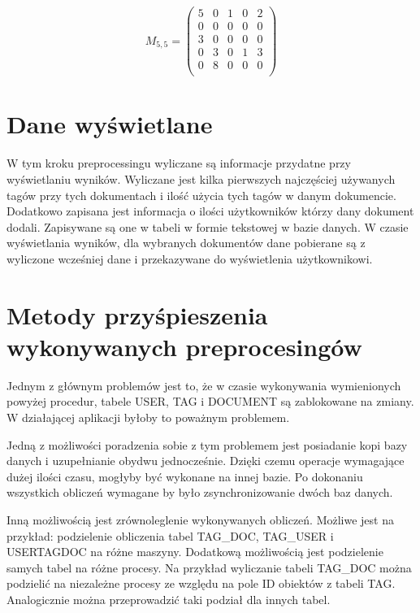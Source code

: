 \documentclass[11pt,a4paper]{report}
\begin{document}
\[
 M_{5,5} =
 \begin{pmatrix}
5 & 0 & 1 & 0 & 2\\
0 & 0 & 0 & 0 & 0\\
3 & 0 & 0 & 0 & 0\\
0 & 3 & 0 & 1 & 3\\
0 & 8 & 0 & 0 & 0\\

 \end{pmatrix}
\]


\section{Dane wyświetlane}
W tym kroku preprocessingu wyliczane są informacje przydatne przy wyświetlaniu wyników. Wyliczane jest kilka pierwszych najczęściej używanych tagów przy tych dokumentach i ilość użycia tych tagów w danym dokumencie. Dodatkowo zapisana jest informacja o ilości użytkowników którzy dany dokument dodali. Zapisywane są one w tabeli w formie tekstowej w bazie danych. W czasie wyświetlania wyników, dla wybranych dokumentów dane pobierane są z wyliczone wcześniej dane i przekazywane do wyświetlenia użytkownikowi. 


\section{Metody przyśpieszenia wykonywanych preprocesingów}

Jednym z głównym problemów jest to, że w czasie wykonywania wymienionych powyżej procedur, tabele USER, TAG i DOCUMENT są zablokowane na zmiany. W działającej aplikacji byłoby to poważnym problemem.  

Jedną z możliwości poradzenia sobie z tym problemem jest posiadanie kopi bazy danych i uzupełnianie obydwu jednocześnie. Dzięki czemu operacje wymagające dużej ilości czasu, mogłyby być wykonane na innej bazie. Po dokonaniu wszystkich obliczeń wymagane by było zsynchronizowanie dwóch baz danych.

Inną możliwością jest zrównoleglenie wykonywanych obliczeń. Możliwe jest na przykład: podzielenie obliczenia tabel TAG\_DOC, TAG\_USER i USERTAGDOC na różne maszyny. Dodatkową możliwością jest podzielenie samych tabel na różne procesy. Na przykład wyliczanie tabeli TAG\_DOC można podzielić na niezależne procesy ze względu na pole ID obiektów z tabeli TAG. Analogicznie można przeprowadzić taki podział dla innych tabel.
\end{document}
